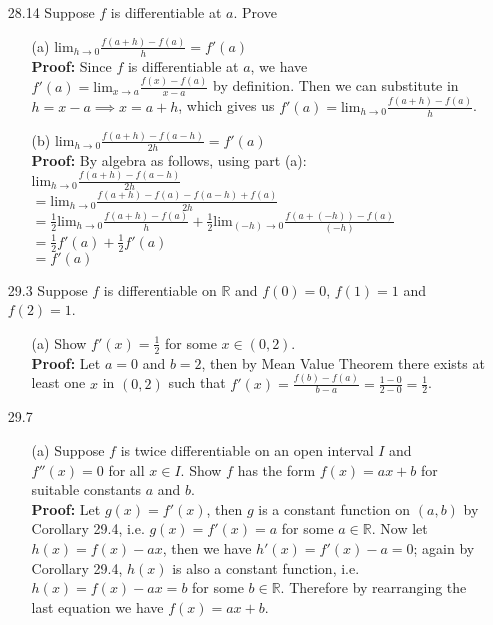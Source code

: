 \documentclass{article}
\begin{document}
\begin{itemize}
    \item [28.14] Suppose $f$ is differentiable at $a$. Prove
          \begin{itemize}
              \item [(a)] $\text{lim}_{h\rightarrow 0}\frac{f(a+h)-f(a)}{h}=f'(a)$\\\textbf{Proof: } Since $f$ is differentiable at $a$, we have $f'(a)=\text{lim}_{x\rightarrow a}\frac{f(x)-f(a)}{x-a}$ by definition. Then we can substitute in $h=x-a\implies x=a+h$, which gives us $f'(a)=\text{lim}_{h\rightarrow 0}\frac{f(a+h)-f(a)}{h}$.
              \item [(b)] $\text{lim}_{h\rightarrow 0}\frac{f(a+h)-f(a-h)}{2h}=f'(a)$\\\textbf{Proof: } By algebra as follows, using part (a):\\$\text{lim}_{h\rightarrow 0}\frac{f(a+h)-f(a-h)}{2h}$\\$=\text{lim}_{h\rightarrow 0}\frac{f(a+h)-f(a)-f(a-h)+f(a)}{2h}$\\$=\frac{1}{2}\text{lim}_{h\rightarrow 0}\frac{f(a+h)-f(a)}{h}+\frac{1}{2}\text{lim}_{(-h)\rightarrow 0}\frac{f(a+(-h))-f(a)}{(-h)}$\\$=\frac{1}{2}f'(a)+\frac{1}{2}f'(a)$\\$=f'(a)$
          \end{itemize}
    \item [29.3] Suppose $f$ is differentiable on $\mathbb{R}$ and $f(0)=0$, $f(1)=1$ and $f(2)=1$.
          \begin{itemize}
              \item [(a)] Show $f'(x)=\frac{1}{2}$ for some $x\in(0,2)$.\\\textbf{Proof: } Let $a=0$ and $b=2$, then by Mean Value Theorem there exists at least one $x$ in $(0,2)$ such that $f'(x)=\frac{f(b)-f(a)}{b-a}=\frac{1-0}{2-0}=\frac{1}{2}$.
          \end{itemize}
    \item [29.7]
          \begin{itemize}
              \item [(a)] Suppose $f$ is twice differentiable on an open interval $I$ and $f''(x)=0$ for all $x\in I$. Show $f$ has the form $f(x)=ax+b$ for suitable constants $a$ and $b$.\\\textbf{Proof: } Let $g(x)=f'(x)$, then $g$ is a constant function on $(a,b)$ by Corollary 29.4, i.e. $g(x)=f'(x)=a$ for some $a\in\mathbb{R}$. Now let $h(x)=f(x)-ax$, then we have $h'(x)=f'(x)-a=0$; again by Corollary 29.4, $h(x)$ is also a constant function, i.e. $h(x)=f(x)-ax=b$ for some $b\in\mathbb{R}$. Therefore by rearranging the last equation we have $f(x)=ax+b$.

\end{itemize}
\end{itemize}
\end{document}
